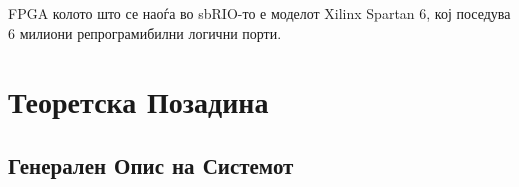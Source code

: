 \documentclass[12pt]{article}
\begin{document}
		FPGA колото што се наоѓа во sbRIO-то е моделот Xilinx Spartan 6, кој поседува 6 милиони репрограмибилни логични порти.

\newpage

\section{Теоретска Позадина}

  \subsection{Генерален Опис на Системот}
    \label{sec:general_desc}
\end{document}
